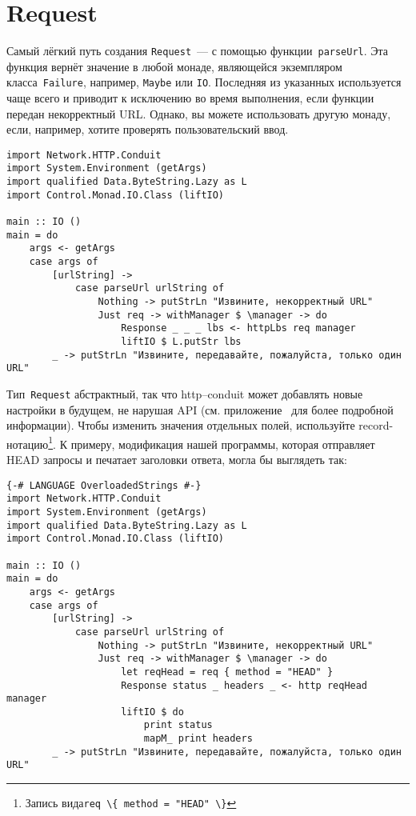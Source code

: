 \section{Request}
Самый лёгкий путь создания \lstinline!Request!~--- с помощью
функции~\lstinline!parseUrl!. Эта функция вернёт значение в любой
монаде, являющейся экземпляром класса~\lstinline!Failure!, например,
\lstinline!Maybe! или \lstinline!IO!. Последняя из указанных
используется чаще всего и приводит к исключению во время выполнения,
если функции передан некорректный URL. Однако, вы можете использовать
другую монаду, если, например, хотите проверять пользовательский ввод.
\begin{lstlisting}
import Network.HTTP.Conduit
import System.Environment (getArgs)
import qualified Data.ByteString.Lazy as L
import Control.Monad.IO.Class (liftIO)

main :: IO ()
main = do
    args <- getArgs
    case args of
        [urlString] ->
            case parseUrl urlString of
                Nothing -> putStrLn "Извините, некорректный URL"
                Just req -> withManager $ \manager -> do
                    Response _ _ _ lbs <- httpLbs req manager
                    liftIO $ L.putStr lbs
        _ -> putStrLn "Извините, передавайте, пожалуйста, только один URL"
\end{lstlisting}
Тип~\lstinline!Request! абстрактный, так что http--conduit может
добавлять новые настройки в будущем, не нарушая API
(см. приложение~ для более подробной
информации). Чтобы изменить значения отдельных полей, используйте
record-нотацию\footnote{Запись вида\lstinline'req \{ method = "HEAD" \}'}. К примеру, модификация
нашей программы, которая отправляет HEAD запросы и печатает заголовки
ответа, могла бы выглядеть так:
\begin{lstlisting}
{-# LANGUAGE OverloadedStrings #-}
import Network.HTTP.Conduit
import System.Environment (getArgs)
import qualified Data.ByteString.Lazy as L
import Control.Monad.IO.Class (liftIO)

main :: IO ()
main = do
    args <- getArgs
    case args of
        [urlString] ->
            case parseUrl urlString of
                Nothing -> putStrLn "Извините, некорректный URL"
                Just req -> withManager $ \manager -> do
                    let reqHead = req { method = "HEAD" }
                    Response status _ headers _ <- http reqHead manager
                    liftIO $ do
                        print status
                        mapM_ print headers
        _ -> putStrLn "Извините, передавайте, пожалуйста, только один URL"
\end{lstlisting} %

